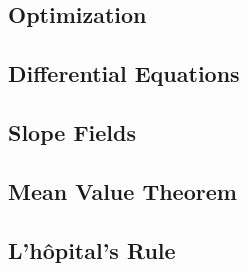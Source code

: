\documentclass{article}
\begin{document}
\subsection{Optimization}
\subsection{Differential Equations}
\subsection{Slope Fields}
\subsection{Mean Value Theorem}
\subsection{L'h\^{o}pital's Rule}
\end{document}

